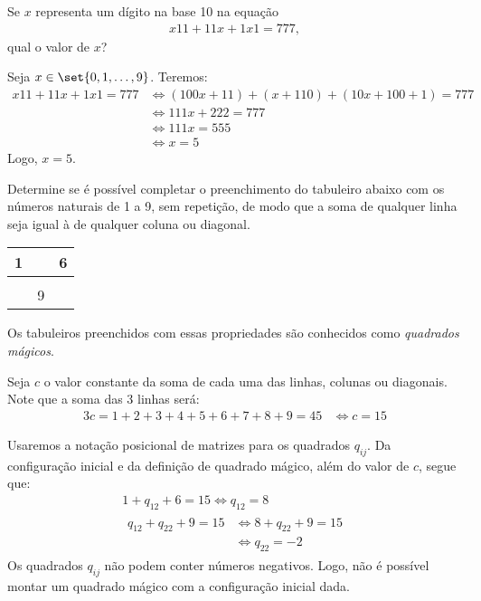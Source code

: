 \begin{example}
Se $x$ representa um dígito na base 10 na equação
%
\begin{align*}
x11 + 11x + 1x1 =777,
\end{align*}
%
 qual o valor de $x$?
\end{example}

\begin{solution}
Seja $x \in \set{0,1,\ldots, 9}$. Teremos:
%
\begin{align*}
x11 + 11x + 1x1 =777 & \iff \left(100x + 11 \right) + \left(x + 110 \right) + \left(10x + 100 + 1 \right) = 777 \\
	& \iff 111x+222 = 777 \\
	& \iff 111x = 555 \\
	& \iff x=5 
\end{align*}
%
Logo, $x=5$.
\end{solution}

\begin{example}
\label{ex:quadrado-magico-3x3}
Determine se é possível completar o preenchimento do tabuleiro abaixo com os números naturais de 1 a 9, sem repetição, de modo que a soma de qualquer linha seja igual à de qualquer coluna ou diagonal.

\begin{center}
\begin{tabular}{|c|c|c|}
	\hline
	1 &   & 6 \\ \hline
		&   &   \\ \hline
		& 9 &   \\
	\hline
\end{tabular}
\end{center}
Os tabuleiros preenchidos com essas propriedades são conhecidos como \emph{quadrados mágicos}.
\end{example}

\begin{solution}
Seja $c$ o valor constante da soma de cada uma das linhas, colunas ou diagonais. Note que a soma das 3 linhas será:
%
\begin{align*}
3c = 1+2+3+4+5+6+7+8+9=45 & \iff c =15
\end{align*}

Usaremos a notação posicional de matrizes para os quadrados $q_{ij}$. Da configuração inicial e da definição de quadrado mágico, além do valor de $c$, segue que:
%
\begin{gather*}
		1+q_{12}+6=15  \iff q_{12} = 8 \\
		\begin{aligned}
						q_{12} + q_{22} + 9= 15 & \iff 8+q_{22} + 9= 15\\
						& \iff q_{22} = -2
		\end{aligned}
\end{gather*}
%
\noindent Os quadrados $q_{ij}$ não podem conter números negativos. Logo, não é possível montar um quadrado mágico com a configuração inicial dada.
\end{solution}

